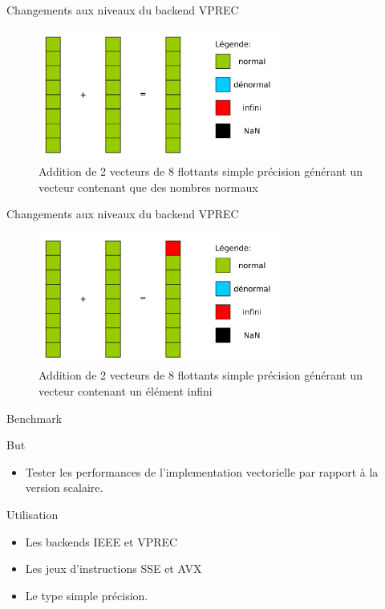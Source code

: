 \documentclass{beamer}
\begin{document}
\begin{frame}{Changements aux niveaux du backend VPREC}

  \begin{figure}
    \centering
    \includegraphics[width=300px]{../ressources/op_normal}
    \caption{\label{fig:ieee_simple_precision}Addition de 2 vecteurs de 8
      flottants simple précision générant un vecteur contenant que des nombres normaux}
  \end{figure}

\end{frame}

\begin{frame}{Changements aux niveaux du backend VPREC}

  \begin{figure}
    \centering
    \includegraphics[width=300px]{../ressources/op_infini}
    \caption{\label{fig:ieee_simple_precision}Addition de 2 vecteurs de 8
      flottants simple précision générant un vecteur contenant un élément infini}
  \end{figure}

\end{frame}

\begin{frame}{Benchmark}
    \begin{block}{But}
      \begin{itemize}
          \item Tester les performances de l'implementation vectorielle par rapport à la version scalaire. 
          
      \end{itemize}
    \end{block}
  \begin{block}{Utilisation}
 
        \begin{itemize}
            \item Les backends IEEE et VPREC
            \item Les jeux d'instructions SSE et AVX
            \item Le type simple précision.
        \end{itemize}
  \end{block}
\end{frame}
\end{document}
